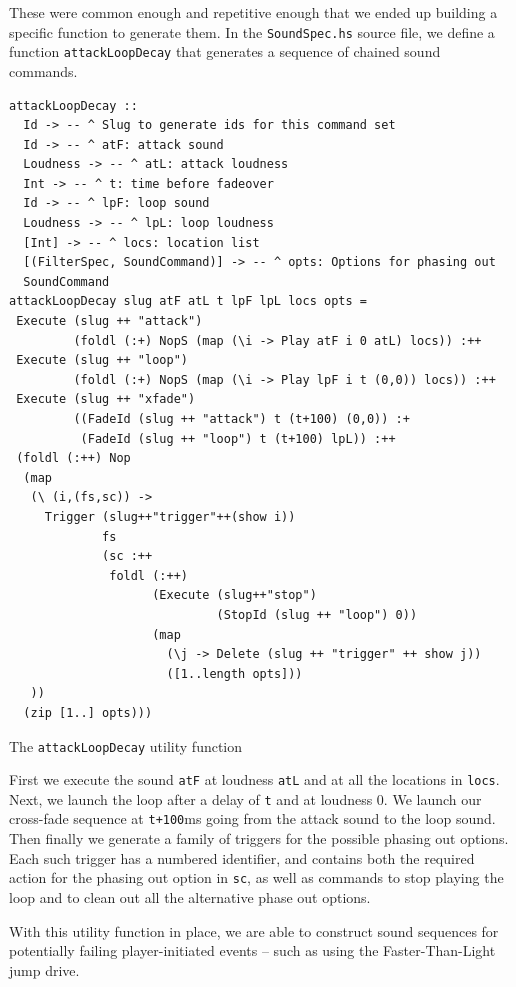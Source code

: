 These were common enough and repetitive enough that we ended up building a specific function to generate them. In the \texttt{SoundSpec.hs} source file, we define a function \texttt{attackLoopDecay} that generates a sequence of chained sound commands.

\begin{listing}
\begin{verbatim}
attackLoopDecay :: 
  Id -> -- ^ Slug to generate ids for this command set
  Id -> -- ^ atF: attack sound
  Loudness -> -- ^ atL: attack loudness
  Int -> -- ^ t: time before fadeover
  Id -> -- ^ lpF: loop sound
  Loudness -> -- ^ lpL: loop loudness
  [Int] -> -- ^ locs: location list
  [(FilterSpec, SoundCommand)] -> -- ^ opts: Options for phasing out
  SoundCommand
attackLoopDecay slug atF atL t lpF lpL locs opts = 
 Execute (slug ++ "attack") 
         (foldl (:+) NopS (map (\i -> Play atF i 0 atL) locs)) :++
 Execute (slug ++ "loop") 
         (foldl (:+) NopS (map (\i -> Play lpF i t (0,0)) locs)) :++
 Execute (slug ++ "xfade") 
         ((FadeId (slug ++ "attack") t (t+100) (0,0)) :+
          (FadeId (slug ++ "loop") t (t+100) lpL)) :++
 (foldl (:++) Nop 
  (map 
   (\ (i,(fs,sc)) -> 
     Trigger (slug++"trigger"++(show i)) 
             fs 
             (sc :++ 
              foldl (:++) 
                    (Execute (slug++"stop") 
                             (StopId (slug ++ "loop") 0))
                    (map 
                      (\j -> Delete (slug ++ "trigger" ++ show j))
                      ([1..length opts]))
   ))
  (zip [1..] opts)))
\end{verbatim}
\caption{The \texttt{attackLoopDecay} utility function}
\end{listing}

First we execute the sound \texttt{atF} at loudness \texttt{atL} and
at all the locations in \texttt{locs}. Next, we launch the loop after
a delay of \texttt{t} and at loudness 0. We launch our cross-fade
sequence at \texttt{t+100}ms going from the attack sound to the loop
sound. Then finally we generate a family of triggers for the possible
phasing out options. Each such trigger has a numbered identifier, and
contains both the required action for the phasing out option in
\texttt{sc}, as well as commands to stop playing the loop and to clean
out all the alternative phase out options.

With this utility function in place, we are able to construct sound
sequences for potentially failing player-initiated events -- such as
using the Faster-Than-Light jump drive.

